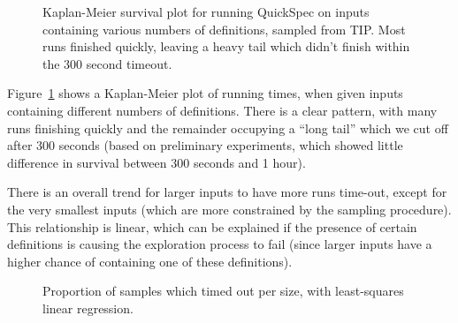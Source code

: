 \begin{figure}
  
  \caption{Kaplan-Meier survival plot for running QuickSpec on inputs containing
    various numbers of definitions, sampled from TIP. Most runs finished
    quickly, leaving a heavy tail which didn't finish within the 300 second
    timeout.}
  \label{fig:survival}
\end{figure}

Figure~\ref{fig:survival} shows a Kaplan-Meier plot of \qspec{} running
times, when given inputs containing different numbers of definitions. There is a
clear pattern, with many runs finishing quickly and the remainder occupying a
``long tail'' which we cut off after 300 seconds (based on preliminary
experiments, which showed little difference in survival between 300 seconds and
1 hour).

There is an overall trend for larger inputs to have more runs time-out, except
for the very smallest inputs (which are more constrained by the sampling
procedure). This relationship is linear, which can be explained if the presence
of certain definitions is causing the exploration process to fail (since larger
inputs have a higher chance of containing one of these definitions).

\begin{figure}
  
  \caption{Proportion of samples which timed out per size, with least-squares
    linear regression.}
  \label{fig:tailsize}
\end{figure}

\begin{figure}
  
  \caption{}
  \label{fig:proportions}
\end{figure}

